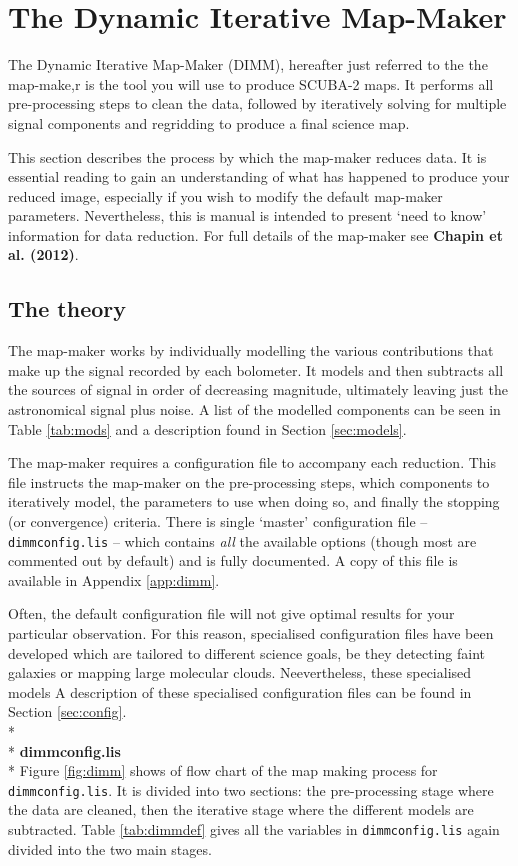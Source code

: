 \documentclass[twoside,11pt]{article}
\newcommand{\xlabel}[1]{}
\renewcommand{\_}{\texttt{\symbol{95}}}
\begin{document}
\section{\xlabel{dimm}The Dynamic Iterative Map-Maker}
\label{sec:dimm}
The Dynamic Iterative Map-Maker (DIMM), hereafter just referred to the the map-make,r is the tool you will use to produce SCUBA-2 maps. It performs all pre-processing steps to clean the data, followed by iteratively solving for multiple signal components and regridding to produce a final science map. 

This section describes the process by which the map-maker reduces data. It is essential reading to gain an understanding of what has happened to produce your reduced image, especially if you wish to modify the default map-maker parameters. Nevertheless, this is manual is intended to present `need to know' information for data reduction. For full details of the map-maker see \textbf{Chapin et al. (2012)}.

\subsection{\xlabel{dimm_theory}The theory}
The map-maker works by individually modelling the various contributions that make up the signal recorded by each bolometer. It models and then subtracts all the sources of signal in order of decreasing magnitude, ultimately leaving just the astronomical signal plus noise. A list of the modelled components can be seen in Table \ref{tab:mods} and a description found in Section \ref{sec:models}.

The map-maker requires a configuration file to accompany each reduction. This file instructs the map-maker on the pre-processing steps, which components to iteratively model, the parameters to use when doing so, and finally the stopping (or convergence) criteria. There is single `master' configuration file -- \texttt{dimmconfig.lis} -- which contains \emph{all} the available options (though most are commented out by default) and is fully documented. A copy of this file is available in Appendix \ref{app:dimm}. 

Often, the default configuration file will not give optimal results for your particular observation. For this reason, specialised configuration files have been developed which are tailored to different science goals, be they detecting faint galaxies or mapping large molecular clouds. Neevertheless, these specialised models A description of these specialised configuration files can be found in Section \ref{sec:config}.
\\*\\*
{\large{\bfseries dimmconfig.lis}}\\*
Figure \ref{fig:dimm} shows of flow chart of the map making process for \texttt{dimmconfig.lis}. It is divided into two sections: the pre-processing stage where the data are cleaned, then the iterative stage where the different models are subtracted. Table \ref{tab:dimmdef} gives all the variables in \texttt{dimmconfig.lis} again divided into the two main stages. 
\end{document}

